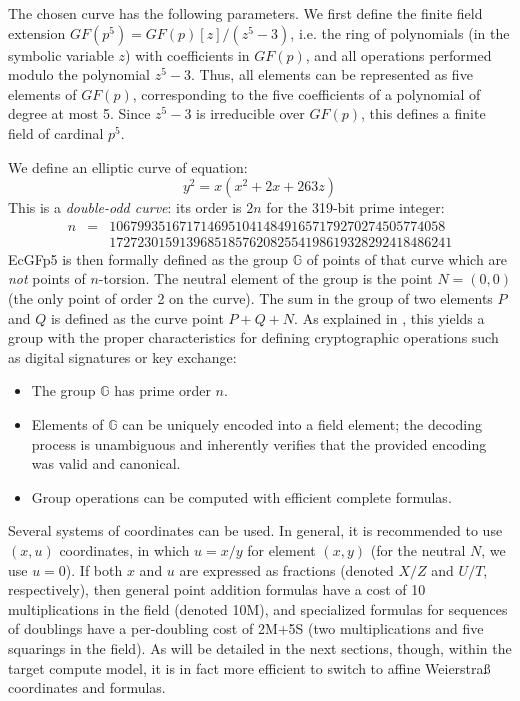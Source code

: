 \documentclass{llncs}
\newcommand{\GF}{GF}
\newcommand{\bG}{\mathbb{G}}
\begin{document}
The chosen curve has the following parameters. We first define the
finite field extension $\GF(p^5) = \GF(p)[z]/(z^5-3)$, i.e. the
ring of polynomials (in the symbolic variable $z$) with coefficients
in $\GF(p)$, and all operations performed modulo the polynomial $z^5-3$.
Thus, all elements can be represented as five elements of $\GF(p)$,
corresponding to the five coefficients of a polynomial of degree at
most 5. Since $z^5-3$ is irreducible over $\GF(p)$, this defines a
finite field of cardinal $p^5$.

We define an elliptic curve of equation:
\begin{equation*}
    y^2 = x(x^2 + 2x + 263z)
\end{equation*}
This is a \emph{double-odd curve}\cite{Por2020-4}: its order is $2n$
for the 319-bit prime integer:
\begin{eqnarray*}
    n &=& 106799351671714695104148491657179270274505774058 \\
      & & 1727230159139685185762082554198619328292418486241
\end{eqnarray*}
EcGFp5 is then formally defined as the group $\bG$ of points of that
curve which are \emph{not} points of $n$-torsion. The neutral element
of the group is the point $N = (0, 0)$ (the only point of order 2 on
the curve). The sum in the group of two elements $P$ and $Q$ is defined
as the curve point $P+Q+N$. As explained in \cite{Por2020-4}, this
yields a group with the proper characteristics for defining cryptographic
operations such as digital signatures or key exchange:
\begin{itemize}

    \item The group $\bG$ has prime order $n$.

    \item Elements of $\bG$ can be uniquely encoded into a field
    element; the decoding process is unambiguous and inherently
    verifies that the provided encoding was valid and canonical.

    \item Group operations can be computed with efficient complete
    formulas.

\end{itemize}

Several systems of coordinates can be used. In general, it is
recommended to use $(x, u)$ coordinates, in which $u = x/y$ for element
$(x, y)$ (for the neutral $N$, we use $u = 0$). If both $x$ and $u$ are
expressed as fractions (denoted $X/Z$ and $U/T$, respectively), then
general point addition formulas have a cost of 10 multiplications in the
field (denoted 10M), and specialized formulas for sequences of doublings
have a per-doubling cost of 2M+5S (two multiplications and five
squarings in the field). As will be detailed in the next sections,
though, within the target compute model, it is in fact more efficient to
switch to affine Weierstraß coordinates and formulas.
\end{document}
